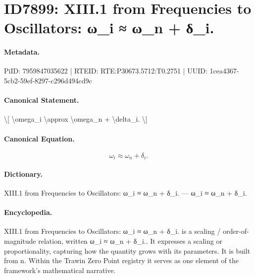 \section*{ID7899: XIII.1 from Frequencies to Oscillators: ω\_i ≈ ω\_n + δ\_i.}
\paragraph{Metadata.}
PiID: 7959847035622 | RTEID: RTE:P30673.5712:T0.2751 | UUID: 1cea4367-5cb2-59ef-8297-c296d494cd9c

\paragraph{Canonical Statement.}
\textbackslash{}[ \textbackslash{}omega\_i \textbackslash{}approx \textbackslash{}omega\_n + \textbackslash{}delta\_i. \textbackslash{}]

\paragraph{Canonical Equation.}
\[
\omega_i \approx \omega_n + \delta_i.
\]

\paragraph{Dictionary.}
XIII.1 from Frequencies to Oscillators: ω\_i ≈ ω\_n + δ\_i. — ω\_i ≈ ω\_n + δ\_i.

\paragraph{Encyclopedia.}
XIII.1 from Frequencies to Oscillators: ω\_i ≈ ω\_n + δ\_i. is a scaling / order-of-magnitude relation, written ω\_i ≈ ω\_n + δ\_i.. It expresses a scaling or proportionality, capturing how the quantity grows with its parameters. It is built from n. Within the Trawin Zero Point registry it serves as one element of the framework's mathematical narrative.
